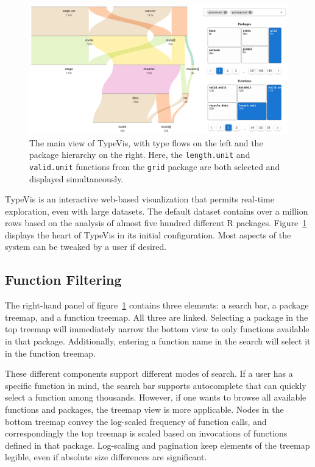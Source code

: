 \documentclass{vgtc}                          %
\begin{document}
\begin{figure}
 \centering
 \includegraphics[width=\linewidth]{img/typevis.png}
 \caption{The main view of {\sc TypeVis}, with type flows on the left and the package hierarchy on the right. Here, the {\tt length.unit} and {\tt valid.unit} functions from the {\tt grid} package are both selected and displayed simultaneously.}
 \label{fig:typevis}
\end{figure}

{\sc TypeVis} is an interactive web-based visualization
that permits real-time exploration,
even with large datasets.
The default dataset contains over a million rows
based on the analysis of almost five hundred
different R packages.
Figure~\ref{fig:typevis} displays
the heart of {\sc TypeVis}
in its initial configuration.
Most aspects of the system can be tweaked
by a user if desired.

\subsection{Function Filtering}

The right-hand panel of figure~\ref{fig:typevis}
contains three elements: a search bar,
a package treemap,
and a function treemap.
All three are linked.
Selecting a package
in the top treemap will immediately narrow the
bottom view to only functions available in that package.
Additionally, entering a function name in the search
will select it in the function treemap.

These different components support different modes of search.
If a user has a specific function in mind,
the search bar supports autocomplete
that can quickly select a function among thousands.
However, if one wants to browse
all available functions and packages,
the treemap view is more applicable.
Nodes in the bottom treemap convey the log-scaled
frequency of function calls,
and correspondingly the top treemap
is scaled based on invocations
of functions defined in that package.
Log-scaling and pagination keep
elements of the treemap legible,
even if absolute size differences are significant.
\end{document}
